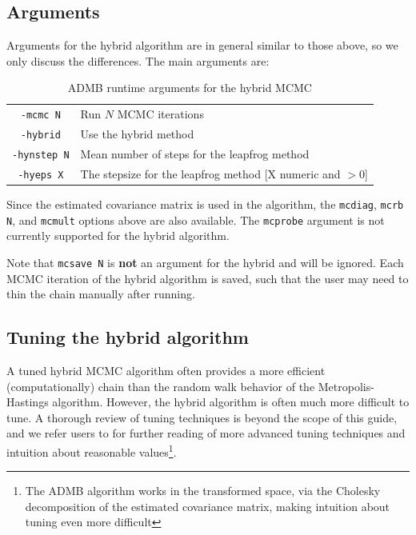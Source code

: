 \documentclass{article}\usepackage[]{graphicx}\usepackage[]{color}
\begin{document}
\subsection{Arguments}
Arguments for the hybrid algorithm are in general similar to
those above, so we only discuss the differences. The main
arguments are:
\begin{table}[H]
  \centering
  \begin{tabular}[h]{|cl|}
    \hline
    \texttt{-mcmc N} & Run $N$ MCMC iterations\\
    \texttt{-hybrid} & Use the hybrid method\\
    \texttt{-hynstep N} & Mean number of steps for the leapfrog method\\
    \texttt{-hyeps X} & The stepsize for the leapfrog method [X numeric and $>0$]\\
    \hline
  \end{tabular}
  \caption{ADMB runtime arguments for the hybrid MCMC}
  \label{tab:hy_args}
\end{table}
Since the estimated covariance matrix is used in the
algorithm, the \texttt{mcdiag}, \texttt{mcrb N}, and
\texttt{mcmult} options above are also available. The
\texttt{mcprobe} argument is not currently supported for the
hybrid algorithm.

Note that \texttt{mcsave N} is \textbf{not} an argument for
the hybrid and will be ignored. Each MCMC iteration of the
hybrid algorithm is saved, such that the user may need to
thin the chain manually after running.

\subsection{Tuning the hybrid algorithm}
A tuned hybrid MCMC algorithm often provides a more
efficient (computationally) chain than the random walk
behavior of the Metropolis-Hastings algorithm. However, the
hybrid algorithm is often much more difficult to tune. A
thorough review of tuning techniques is beyond the scope of
this guide, and we refer users to \cite{brooks2011} for
further reading of more advanced tuning techniques and
intuition about reasonable values\footnote{The ADMB
  algorithm works in the transformed space, via the Cholesky
  decomposition of the estimated covariance matrix, making
  intuition about tuning even more difficult}.
\end{document}
